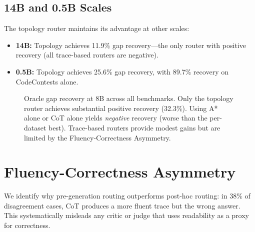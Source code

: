 \subsection{14B and 0.5B Scales}

The topology router maintains its advantage at other scales:
\begin{itemize}
\item \textbf{14B:} Topology achieves 11.9\% gap recovery---the only router with positive recovery (all trace-based routers are negative).
\item \textbf{0.5B:} Topology achieves 25.6\% gap recovery, with 89.7\% recovery on CodeContests alone.
\end{itemize}

\begin{figure}[htbp]
\centering
{}
\caption{Oracle gap recovery at 8B across all benchmarks. Only the topology router achieves substantial positive recovery (32.3\%). Using A* alone or CoT alone yields \emph{negative} recovery (worse than the per-dataset best). Trace-based routers provide modest gains but are limited by the Fluency-Correctness Asymmetry.}
\label{fig:gap_recovery}
\end{figure}

\section{Fluency-Correctness Asymmetry}

We identify why pre-generation routing outperforms post-hoc routing: in 38\% of disagreement cases, CoT produces a more fluent trace but the wrong answer. This systematically misleads any critic or judge that uses readability as a proxy for correctness.


